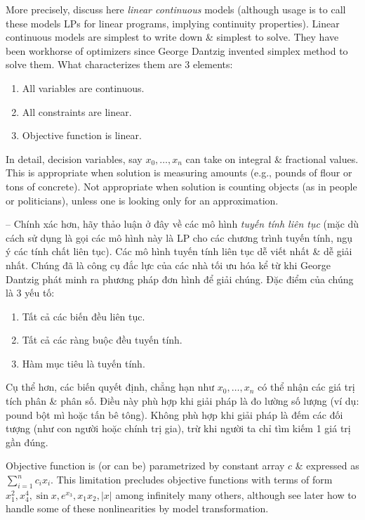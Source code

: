 \documentclass{article}
\begin{document}
\begin{itemize}
    More precisely, discuss here {\it linear continuous} models (although usage is to call these models LPs for linear programs, implying continuity properties). Linear continuous models are simplest to write down \& simplest to solve. They have been workhorse of optimizers since {\sc George Dantzig} invented simplex method to solve them. What characterizes them are 3 elements:
    \begin{enumerate}
        \item All variables are continuous.
        \item All constraints are linear.
        \item Objective function is linear.
    \end{enumerate}
    In detail, decision variables, say $x_0,\ldots,x_n$ can take on integral \& fractional values. This is appropriate when solution is measuring amounts (e.g., pounds of flour or tons of concrete). Not appropriate when solution is counting objects (as in people or politicians), unless one is looking only for an approximation.

    -- Chính xác hơn, hãy thảo luận ở đây về các mô hình {\it tuyến tính liên tục} (mặc dù cách sử dụng là gọi các mô hình này là LP cho các chương trình tuyến tính, ngụ ý các tính chất liên tục). Các mô hình tuyến tính liên tục dễ viết nhất \& dễ giải nhất. Chúng đã là công cụ đắc lực của các nhà tối ưu hóa kể từ khi {\sc George Dantzig} phát minh ra phương pháp đơn hình để giải chúng. Đặc điểm của chúng là 3 yếu tố:
    \begin{enumerate}
        \item Tất cả các biến đều liên tục.
        \item Tất cả các ràng buộc đều tuyến tính.
        \item Hàm mục tiêu là tuyến tính.
    \end{enumerate}
    Cụ thể hơn, các biến quyết định, chẳng hạn như $x_0,\ldots,x_n$ có thể nhận các giá trị tích phân \& phân số. Điều này phù hợp khi giải pháp là đo lường số lượng (ví dụ: pound bột mì hoặc tấn bê tông). Không phù hợp khi giải pháp là đếm các đối tượng (như con người hoặc chính trị gia), trừ khi người ta chỉ tìm kiếm 1 giá trị gần đúng.

    Objective function is (or can be) parametrized by constant array $c$ \& expressed as $\sum_{i=1}^n c_ix_i$. This limitation precludes objective functions with terms of form $x_1^2,x_4^4,\sin x,e^{x_3},x_1x_2,|x|$ among infinitely many others, although see later how to handle some of these nonlinearities by model transformation.


\end{itemize}
\end{document}
